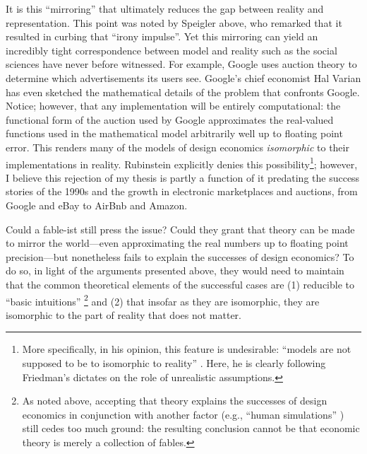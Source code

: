 It is this ``mirroring'' that ultimately reduces the gap between reality and representation. This point was noted by Speigler \autocite*{spiegler2024} above, who remarked that it resulted in curbing that ``irony impulse''. Yet this mirroring can yield an incredibly tight correspondence between model and reality such as the social sciences have never before witnessed. For example, Google uses auction theory to determine which advertisements its users see. Google's chief economist Hal Varian \autocite*{varian2009} has even sketched the mathematical details of the problem that confronts Google. Notice; however, that any implementation will be entirely computational: the functional form of the auction used by Google approximates the real-valued functions used in the mathematical model arbitrarily well up to floating point error. This renders many of the models of design economics \textit{isomorphic} to their implementations in reality. Rubinstein \autocite*{rubinstein1991} explicitly denies this possibility\footnote{More specifically, in his opinion, this feature is undesirable: ``models are not supposed to be to isomorphic to reality'' \autocite[918]{rubinstein1991}. Here, he is clearly following Friedman's \autocite*{friedman1953} dictates on the role of unrealistic assumptions.}; however, I believe this rejection of my thesis is partly a function of it predating the success stories of the 1990s and the growth in electronic marketplaces and auctions, from Google and eBay to AirBnb and Amazon.

Could a fable-ist still press the issue? Could they grant that theory can be made to mirror the world---even approximating the real numbers up to floating point precision---but nonetheless fails to explain the successes of design economics? To do so, in light of the arguments presented above, they would need to maintain that the common theoretical elements of the successful cases are (1) reducible to ``basic intuitions'' \autocite[above]{rubinstein2012}\footnote{As noted above, accepting that theory explains the successes of design economics in conjunction with another factor (e.g., ``human simulations'' \autocite[above]{rubinstein2012}) still cedes too much ground: the resulting conclusion cannot be that economic theory is merely a collection of fables.} and (2) that insofar as they are isomorphic, they are isomorphic to the part of reality that does not matter.

